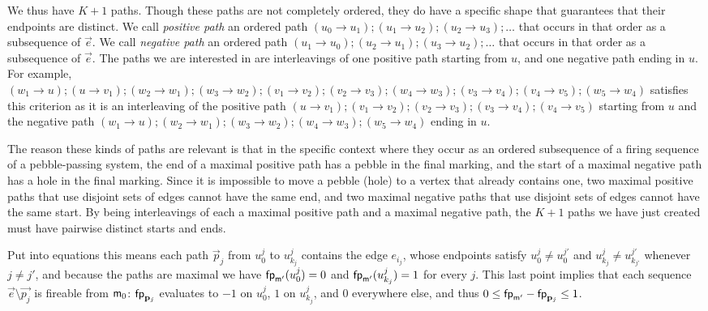 \begin{proofE}
  We thus have $K+1$ paths.
  Though these paths are not completely ordered,
  they do have a specific shape that guarantees that their endpoints are distinct.
  We call \emph{positive path} an ordered path $(u_0 \to u_1); (u_1 \to u_2); (u_2 \to u_3); \ldots$
  that occurs in that order as a subsequence of $\vec{e}$.
  We call \emph{negative path} an ordered path $(u_1 \to u_0); (u_2 \to u_1); (u_3 \to u_2); \ldots$
  that occurs in that order as a subsequence of $\vec{e}$.
  The paths we are interested in are interleavings of one positive path starting from $u$,
  and one negative path ending in $u$.
  For example, $(w_1 \to u); (u \to v_1); (w_2 \to w_1); (w_3 \to w_2); (v_1 \to v_2); (v_2 \to v_3); (w_4 \to w_3); (v_3 \to v_4); (v_4 \to v_5); (w_5 \to w_4)$
  satisfies this criterion as it is an interleaving
  of the positive path
  $(u \to v_1); (v_1 \to v_2); (v_2 \to v_3); (v_3 \to v_4); (v_4 \to v_5)$
  starting from $u$
  and the negative path
  $(w_1 \to u); (w_2 \to w_1); (w_3 \to w_2); (w_4 \to w_3); (w_5 \to w_4)$
  ending in $u$.

  The reason these kinds of paths are relevant is that in the specific context where they occur
  as an ordered subsequence of a firing sequence of a pebble-passing system,
  the end of a maximal positive path has a pebble in the final marking,
  and the start of a maximal negative path has a hole in the final marking.
  Since it is impossible to move a pebble (\resp hole) to a vertex that already contains one,
  two maximal positive paths that use disjoint sets of edges cannot have the same end,
  and two maximal negative paths that use disjoint sets of edges cannot have the same start.
  By being interleavings of each a maximal positive path and a maximal negative path,
  the $K + 1$ paths we have just created must have pairwise distinct starts and ends.

  Put into equations this means
  each path $\vec{p}_j$ from $u_0^j$ to $u_{k_j}^j$ contains the edge $e_{i_j}$,
  whose endpoints satisfy $u_0^j \ne u_0^{j'}$ and $u_{k_j}^j \ne u_{k_{j'}}^{j'}$ whenever $j \ne j'$,
  and because the paths are maximal we have $\mathsf{fp}_{\mathsf{m}'}(u_0^j) = 0$
  and $\mathsf{fp}_{\mathsf{m}'}(u_{k_j}^j) = 1$ for every $j$.
  This last point implies that each sequence $\vec{e} \setminus \vec{p_j}$ is fireable from $\mathsf{m}_0$:
  $\mathsf{fp}_{\mathbf{p}_j}$ evaluates to $-1$ on $u_0^j$, $1$ on $u_{k_j}^j$, and 0 everywhere else,
  and thus $0 \leq \mathsf{fp}_{\mathsf{m}'} - \mathsf{fp}_{\mathbf{p}_j} \leq 1$.


\end{proofE}
